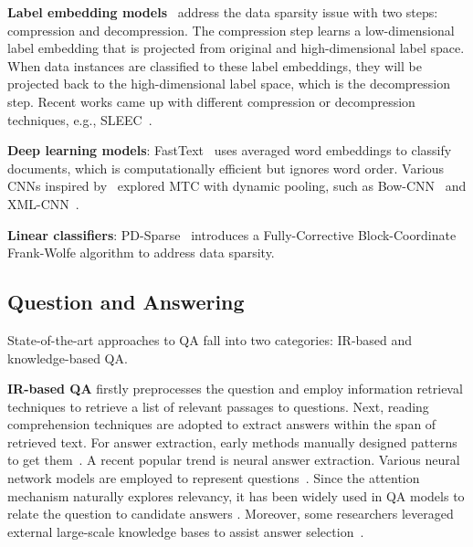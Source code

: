 \documentclass[11pt,a4paper]{article}
\newcommand{\1}{\boldsymbol{1}}
\begin{document}
\textbf{Label embedding models}~\cite{balasubramanian2012landmark,chen2012feature,cisse2013robust,bi2013efficient,ferng2011multi,hsu2009multi,ji2008extracting,kapoor2012multilabel,lewis2004rcv1,yu2014large} address the data sparsity issue with two steps: compression and decompression. The compression step learns a low-dimensional label embedding that is projected from original and high-dimensional label space. When data instances are classified to these label embeddings, they will be projected back to the high-dimensional label space, 
which is the decompression step. Recent works came up with different compression or decompression techniques, e.g., SLEEC~\cite{bhatia2015sparse}. 

\textbf{Deep learning models}: FastText~\cite{joulin2016bag} uses averaged word embeddings to classify documents,
which is computationally efficient but 
ignores word order. 
Various CNNs inspired by~\citet{kim2014convolutional} explored MTC with dynamic pooling, such as Bow-CNN~\cite{johnson2014effective} and XML-CNN~\cite{liu2017deep}. 

\textbf{Linear classifiers}: PD-Sparse~\cite{yen2016pd} introduces a Fully-Corrective Block-Coordinate Frank-Wolfe algorithm to address data sparsity. 





\subsection{Question and Answering}
State-of-the-art approaches to QA fall into two categories: IR-based and knowledge-based QA.

\textbf{IR-based QA} firstly preprocesses the question and employ information retrieval techniques to retrieve a list of relevant passages to questions. Next, reading comprehension techniques are adopted to extract answers within the span of retrieved text. For answer extraction, early methods manually designed patterns to get them~\cite{pacsca2003open}. A recent popular trend is neural answer extraction. Various neural network models are employed to represent questions~\cite{severyn2015learning,wang2015long}. Since the attention mechanism naturally explores relevancy, it has been widely used in QA models to relate the question to candidate answers 
\cite{tan2016improved,santos2016attentive,sha2018multi}. Moreover, some researchers leveraged external large-scale knowledge bases to assist answer selection~\cite{savenkov2017evinets,shen2018knowledge,deng2018knowledge}. 
\end{document}
